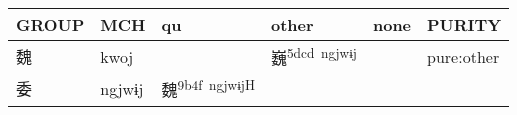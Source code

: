 \documentclass[14pt,a4paper]{scrartcl}
\begin{document}
\begin{longtable}[c]{@{}llllll@{}}
\toprule
\begin{minipage}[b]{0.14\columnwidth}\raggedright\strut
GROUP
\strut\end{minipage} &
\begin{minipage}[b]{0.14\columnwidth}\raggedright\strut
MCH
\strut\end{minipage} &
\begin{minipage}[b]{0.14\columnwidth}\raggedright\strut
qu
\strut\end{minipage} &
\begin{minipage}[b]{0.14\columnwidth}\raggedright\strut
other
\strut\end{minipage} &
\begin{minipage}[b]{0.14\columnwidth}\raggedright\strut
none
\strut\end{minipage} &
\begin{minipage}[b]{0.14\columnwidth}\raggedright\strut
PURITY
\strut\end{minipage}\tabularnewline
\midrule
\endhead
\begin{minipage}[t]{0.14\columnwidth}\raggedright\strut
魏
\strut\end{minipage} &
\begin{minipage}[t]{0.14\columnwidth}\raggedright\strut
kwoj
\strut\end{minipage} &
\begin{minipage}[t]{0.14\columnwidth}\raggedright\strut
\strut\end{minipage} &
\begin{minipage}[t]{0.14\columnwidth}\raggedright\strut
巍\textsuperscript{5dcd~ngjwɨj}
\strut\end{minipage} &
\begin{minipage}[t]{0.14\columnwidth}\raggedright\strut
\strut\end{minipage} &
\begin{minipage}[t]{0.14\columnwidth}\raggedright\strut
pure:other
\strut\end{minipage}\tabularnewline
\begin{minipage}[t]{0.14\columnwidth}\raggedright\strut
委
\strut\end{minipage} &
\begin{minipage}[t]{0.14\columnwidth}\raggedright\strut
ngjwɨj
\strut\end{minipage} &
\begin{minipage}[t]{0.14\columnwidth}\raggedright\strut
魏\textsuperscript{9b4f~ngjwɨjH}
\strut\end{minipage} &

\end{longtable}
\end{document}
